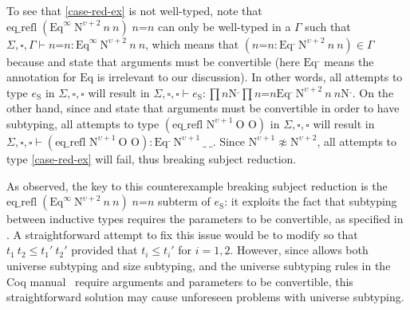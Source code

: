 To see that \eqref{case-red-ex} is not well-typed, note that
$\textrm{eq\_refl} \; (\textrm{Eq}^\infty ~
\textrm{N}^{\upsilon+2} ~ n ~ n) \; n\textrm{=}n$
can only be well-typed in a $\Gamma$ such that
$\Sigma,\square,\Gamma \vdash n\textrm{=}n : \textrm{Eq}^\infty ~ \textrm{N}^{\upsilon+2} ~ n ~ n$,
which means that $(n\textrm{=}n : \textrm{Eq}^\_ ~ \textrm{N}^{\upsilon+2} ~ n ~ n) \in \Gamma$
because  and  state that arguments
must be convertible (here $\textrm{Eq}^\_$ means the annotation for
$\textrm{Eq}$ is irrelevant to our discussion).
%
In other words, all attempts to type $e_{\textrm{S}}$ in $\Sigma,\square,\square$
will result in
$\Sigma,\square,\square \vdash e_{\textrm{S}} : \prod{n}{\textrm{N}^\_}{\prod{n\textrm{=}n}{\textrm{Eq}^\_ ~ \textrm{N}^{\upsilon+2} ~ n ~ n}{\textrm{N}^\_}}$.
%
On the other hand, since  and  state
that arguments must be convertible in order to have subtyping,
all attempts to type $(\textrm{eq\_refl N}^{\upsilon+1} ~ \textrm{O O})$
in $\Sigma,\square,\square$ will result in
$\Sigma,\square,\square \vdash
(\textrm{eq\_refl N}^{\upsilon+1} ~ \textrm{O O}) :
\textrm{Eq}^\_ ~ \textrm{N}^{\upsilon+1} ~ \_ ~ \_$.
%
Since $\textrm{N}^{\upsilon+1} \napprox \textrm{N}^{\upsilon+2}$, all attempts
to type \eqref{case-red-ex} will fail, thus breaking subject
reduction.

As observed, the key to this counterexample
breaking subject reduction is the $\textrm{eq\_refl} \;
(\textrm{Eq}^\infty \allowbreak ~ \textrm{N}^{\upsilon+2} ~ n ~ n) \; n\textrm{=}n$
subterm of $e_{\textrm{S}}$:
%
it exploits the fact that subtyping between inductive types
requires the parameters to be convertible, as specified in
.
%
A straightforward attempt to fix this issue would be to modify
 so that $t_1 ~ t_2 \leq t_1' ~ t_2'$ provided that
$t_i \leq t_i'$ for $i = 1,2$.
%
%
However, since \lang allows both universe subtyping and size subtyping,
and the universe subtyping rules in the Coq
manual~\cite{coq} require arguments and parameters to be convertible,
this straightforward solution may cause unforeseen
problems with universe subtyping.


